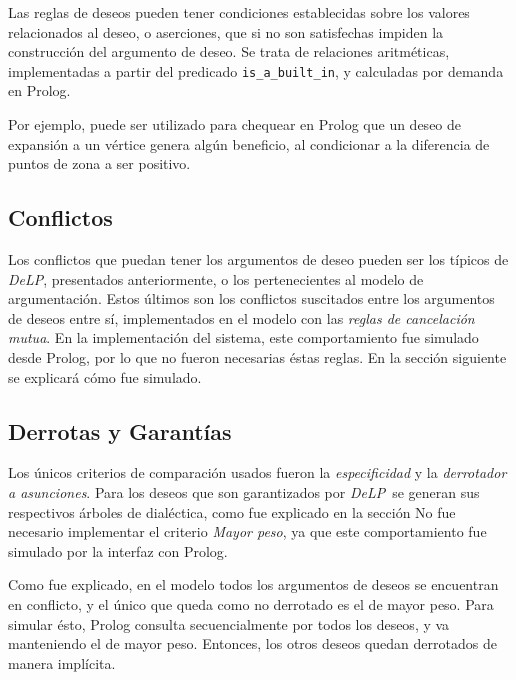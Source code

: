 \documentclass[oneside]{book}
\theoremstyle{definition}
\newcommand{\DLP}{\mbox{\textit{DeLP}}}
\begin{document}
Las reglas de deseos pueden tener condiciones establecidas sobre los valores relacionados al deseo,
o aserciones, que
si no son satisfechas impiden la construcción del argumento de deseo. Se trata de relaciones aritméticas,
implementadas a partir del predicado \texttt{is\_a\_built\_in}, y calculadas por demanda en Prolog.

Por ejemplo, puede ser utilizado para chequear en Prolog que un deseo de expansión a un vértice genera
algún beneficio, al condicionar a la diferencia de puntos de zona a ser positivo.

\subsection{Conflictos}

Los conflictos que puedan tener los argumentos de deseo pueden ser los típicos de \DLP,
presentados anteriormente, o
los pertenecientes al modelo de argumentación. Estos últimos son los conflictos suscitados entre 
los argumentos de deseos entre sí, implementados en el modelo con las \textit{reglas de cancelación
mutua}. En la implementación del sistema, este comportamiento fue simulado desde Prolog, por lo que 
no fueron necesarias éstas reglas. En la sección siguiente se explicará cómo fue simulado.

\subsection{Derrotas y Garantías}

Los únicos criterios de comparación usados fueron la \textit{especificidad} y la \textit{derrotador a 
asunciones}. Para los deseos que son garantizados por \DLP\ se generan sus respectivos árboles de dialéctica, como 
fue explicado en la sección %
No fue necesario implementar el criterio \textit{Mayor peso}, ya que este comportamiento
fue simulado por la interfaz con Prolog.

Como fue explicado, en el modelo todos los argumentos de deseos se encuentran en conflicto, y el 
único que queda como no derrotado es el de mayor peso. Para simular ésto, Prolog consulta 
secuencialmente por todos los deseos, y va manteniendo el de mayor peso. Entonces, los otros deseos
quedan derrotados de manera implícita.
\end{document}
